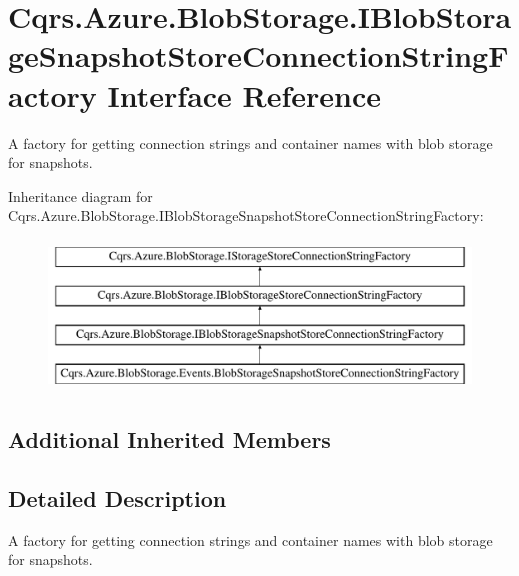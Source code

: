 \hypertarget{interfaceCqrs_1_1Azure_1_1BlobStorage_1_1IBlobStorageSnapshotStoreConnectionStringFactory}{}\section{Cqrs.\+Azure.\+Blob\+Storage.\+I\+Blob\+Storage\+Snapshot\+Store\+Connection\+String\+Factory Interface Reference}
\label{interfaceCqrs_1_1Azure_1_1BlobStorage_1_1IBlobStorageSnapshotStoreConnectionStringFactory}


A factory for getting connection strings and container names with blob storage for snapshots.  


Inheritance diagram for Cqrs.\+Azure.\+Blob\+Storage.\+I\+Blob\+Storage\+Snapshot\+Store\+Connection\+String\+Factory\+:\begin{figure}[H]
\begin{center}
\leavevmode
\includegraphics[height=4.000000cm]{interfaceCqrs_1_1Azure_1_1BlobStorage_1_1IBlobStorageSnapshotStoreConnectionStringFactory}
\end{center}
\end{figure}
\subsection*{Additional Inherited Members}


\subsection{Detailed Description}
A factory for getting connection strings and container names with blob storage for snapshots. 

